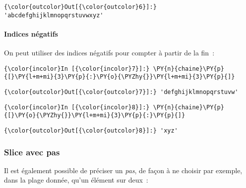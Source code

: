 \begin{Verbatim}[commandchars=\\\{\},frame=single,framerule=0.3mm,rulecolor=\color{cellframecolor}]
{\color{outcolor}Out[{\color{outcolor}6}]:} 'abcdefghijklmnopqrstuvwxyz'
\end{Verbatim}
            
    \hypertarget{indices-nuxe9gatifs}{%
\paragraph{Indices négatifs}\label{indices-nuxe9gatifs}}

    On peut utiliser des indices négatifs pour compter à partir de la fin~:

    \begin{Verbatim}[commandchars=\\\{\},frame=single,framerule=0.3mm,rulecolor=\color{cellframecolor}]
{\color{incolor}In [{\color{incolor}7}]:} \PY{n}{chaine}\PY{p}{[}\PY{l+m+mi}{3}\PY{p}{:}\PY{o}{\PYZhy{}}\PY{l+m+mi}{3}\PY{p}{]}
\end{Verbatim}


\begin{Verbatim}[commandchars=\\\{\},frame=single,framerule=0.3mm,rulecolor=\color{cellframecolor}]
{\color{outcolor}Out[{\color{outcolor}7}]:} 'defghijklmnopqrstuvw'
\end{Verbatim}
            
    \begin{Verbatim}[commandchars=\\\{\},frame=single,framerule=0.3mm,rulecolor=\color{cellframecolor}]
{\color{incolor}In [{\color{incolor}8}]:} \PY{n}{chaine}\PY{p}{[}\PY{o}{\PYZhy{}}\PY{l+m+mi}{3}\PY{p}{:}\PY{p}{]}
\end{Verbatim}


\begin{Verbatim}[commandchars=\\\{\},frame=single,framerule=0.3mm,rulecolor=\color{cellframecolor}]
{\color{outcolor}Out[{\color{outcolor}8}]:} 'xyz'
\end{Verbatim}
            
    \hypertarget{slice-avec-pas}{%
\subsubsection{Slice avec pas}\label{slice-avec-pas}}

    Il est également possible de préciser un \emph{pas}, de façon à ne
choisir par exemple, dans la plage donnée, qu'un élément sur deux~:

